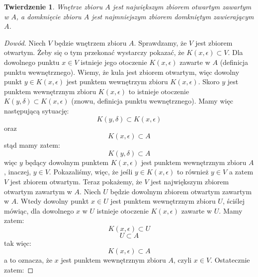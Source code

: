 \documentclass{article}
\newtheorem*{theorem}{Twierdzenie}
\begin{document}
\begin{theorem}
    Wnętrze zbioru \(A\) jest największym zbiorem otwartym zawartym w \(A\), a domknięcie zbioru \(A\) jest najmniejszym
    zbiorem domkniętym zawierającym \(A\).
\end{theorem}
\begin{proof}[Dowód]
    Niech \(V\) będzie wnętrzem zbioru \(A\). Sprawdzamy, że \(V\) jest zbiorem otwartym. Żeby się o tym przekonać
    wystarczy pokazać, że \(K(x, \epsilon) \subset V\). Dla dowolnego punktu \(x \in V\)
    istnieje jego otoczenie \(K(x, \epsilon)\) zawarte w \(A\) (definicja punktu wewnętrznego). Wiemy, że kula jest zbiorem
    otwartym, więc dowolny punkt \(y \in K(x, \epsilon)\) jest punktem wewnętrzym zbioru \(K(x, \epsilon)\). Skoro \(y\)
    jest punktem wewnętrznym zbioru \(K(x, \epsilon)\) to istnieje otoczenie \(K(y, \delta) \subset K(x, \epsilon) \)
    (znowu, definicja punktu wewnętrznego). Mamy więc następującą sytuację:
    \begin{equation*}
        K(y, \delta) \subset K(x, \epsilon)
    \end{equation*}
    oraz
    \begin{equation*}
        K(x, \epsilon) \subset A
    \end{equation*}
    stąd mamy zatem:
    \begin{equation*}
        K(y, \delta) \subset A
    \end{equation*}
    więc \(y\) będący dowolnym punktem \(K(x, \epsilon)\) jest punktem wewnętrznym zbioru \(A\), inaczej, \(y \in V\).
    Pokazaliśmy, więc, że jeśli \(y \in K(x, \epsilon)\) to również \(y \in V\) a zatem \(V\) jest zbiorem otwartym.
    Teraz pokażemy, że \(V\) jest największym zbiorem otwartym zawartym w \(A\). Niech \(U\) będzie dowolnym zbiorem
    otwartym zawartym w \(A\). Wtedy dowolny punkt \(x \in U\) jest punktem wewnętrznym zbioru \(U\), ściślej mówiąc,
    dla dowolnego \(x\) w \(U\) istnieje otoczenie \(K(x, \epsilon)\) zawarte w \(U\). Mamy zatem:
    \begin{equation*}
        K(x, \epsilon) \subset U
    \end{equation*}
    \begin{equation*}
        U \subset A
    \end{equation*}
    tak więc:
    \begin{equation*}
        K(x, \epsilon) \subset A
    \end{equation*}
    a to oznacza, że \(x\) jest punktem wewnętrznym zbioru \(A\), czyli \(x \in V\). Ostatecznie zatem:

\end{proof}
\end{document}
